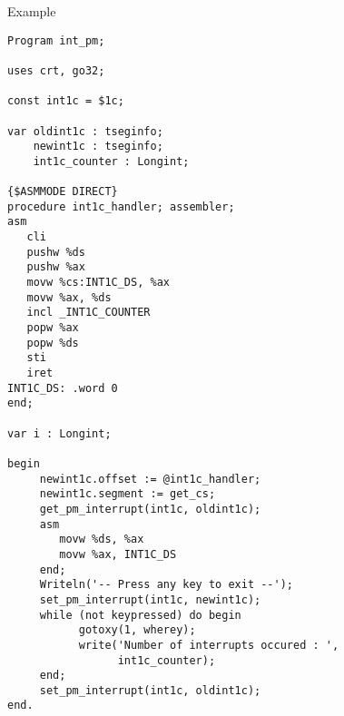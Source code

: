 \begin{FPCList}
\item[Example]
\begin{verbatim}
Program int_pm;

uses crt, go32;

const int1c = $1c; 

var oldint1c : tseginfo;
    newint1c : tseginfo;
    int1c_counter : Longint;

{$ASMMODE DIRECT}
procedure int1c_handler; assembler;
asm
   cli
   pushw %ds
   pushw %ax
   movw %cs:INT1C_DS, %ax
   movw %ax, %ds
   incl _INT1C_COUNTER
   popw %ax
   popw %ds
   sti
   iret
INT1C_DS: .word 0
end;

var i : Longint;

begin
     newint1c.offset := @int1c_handler;
     newint1c.segment := get_cs;
     get_pm_interrupt(int1c, oldint1c);
     asm
        movw %ds, %ax
        movw %ax, INT1C_DS
     end;
     Writeln('-- Press any key to exit --');
     set_pm_interrupt(int1c, newint1c);
     while (not keypressed) do begin
           gotoxy(1, wherey); 
           write('Number of interrupts occured : ', 
                 int1c_counter);
     end;
     set_pm_interrupt(int1c, oldint1c);
end.\end{verbatim}
\end{FPCList}